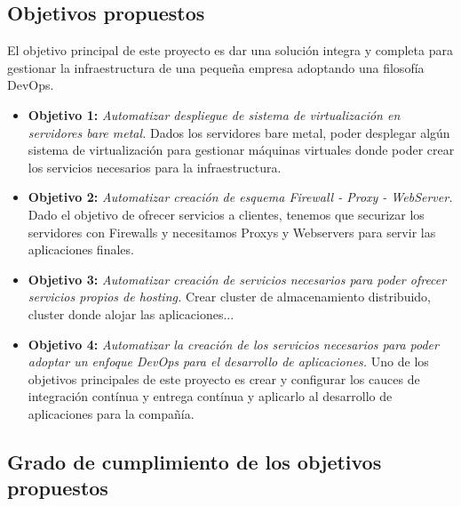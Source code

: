 	\subsection{Objetivos propuestos}
		\begin{paragraph}
			El objetivo principal de este proyecto es dar una solución integra y completa para gestionar la infraestructura de una pequeña empresa adoptando una filosofía DevOps.
		\end{paragraph}
		\begin{itemize}
			\item \textbf{Objetivo 1:} \textit{Automatizar despliegue de sistema de virtualización en servidores bare metal.}  Dados los servidores bare metal, poder desplegar algún sistema de virtualización para gestionar máquinas virtuales donde poder crear los servicios necesarios para la infraestructura.
			\item \textbf{Objetivo 2:} \textit{Automatizar creación de esquema Firewall - Proxy - WebServer.}  Dado el objetivo de ofrecer servicios a clientes, tenemos que securizar los servidores con Firewalls y necesitamos Proxys y Webservers para servir las aplicaciones finales. 
			\item \textbf{Objetivo 3:} \textit{Automatizar creación de servicios necesarios para poder ofrecer servicios propios de hosting.} Crear cluster de almacenamiento distribuido, cluster donde alojar las aplicaciones...
			\item \textbf{Objetivo 4:} \textit{Automatizar la creación de los servicios necesarios para poder adoptar un enfoque DevOps para el desarrollo de aplicaciones.} Uno de los objetivos principales de este proyecto es crear y configurar los cauces de integración contínua y entrega contínua y aplicarlo al desarrollo de aplicaciones para la compañía.
		\end{itemize}
 
	\subsection{Grado de cumplimiento de los objetivos propuestos}






